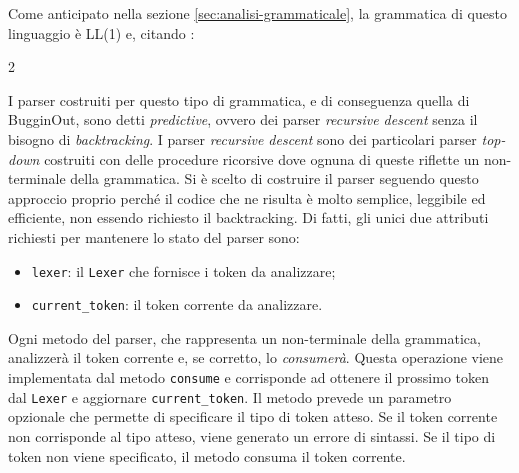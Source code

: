 Come anticipato nella sezione \ref{sec:analisi-grammaticale}, la grammatica di questo linguaggio \`e LL(1) e, citando \cite{alfred2007compilers}:
\begin{parcolumns}[colwidths={1=0.44\textwidth,2=0.44\textwidth},rulebetween=true,nofirstindent=true,sloppy=true]{2}
	\colplacechunks
\end{parcolumns}

I parser costruiti per questo tipo di grammatica, e di conseguenza quella di BugginOut, sono detti \emph{predictive}, ovvero dei parser \emph{recursive descent} senza il bisogno di \emph{backtracking}. I parser \emph{recursive descent} sono dei particolari parser \emph{top-down} costruiti con delle procedure ricorsive dove ognuna di queste riflette un non-terminale della grammatica. Si \`e scelto di costruire il parser seguendo questo approccio proprio perch\'e il codice che ne risulta \`e molto semplice, leggibile ed efficiente, non essendo richiesto il backtracking. Di fatti, gli unici due attributi richiesti per mantenere lo stato del parser sono:
\begin{itemize}
	\item \texttt{lexer}: il \texttt{Lexer} che fornisce i token da analizzare;
	\item \texttt{current\_token}: il token corrente da analizzare.
\end{itemize}

Ogni metodo del parser, che rappresenta un non-terminale della grammatica, analizzer\`a il token corrente e, se corretto, lo \emph{consumer\`a}. Questa operazione viene implementata dal metodo \texttt{consume} e corrisponde ad ottenere il prossimo token dal \texttt{Lexer} e aggiornare \texttt{current\_token}. Il metodo prevede un parametro opzionale che permette di specificare il tipo di token atteso. Se il token corrente non corrisponde al tipo atteso, viene generato un errore di sintassi. Se il tipo di token non viene specificato, il metodo consuma il token corrente.

